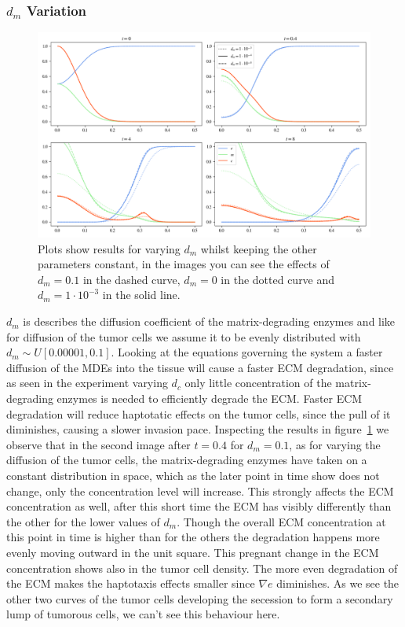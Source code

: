\subsubsection*{$d_m$ Variation}
\begin{figure}[h]
    \centering
    \includegraphics[width=\textwidth]{resources/images/dm_variation.png}
    \caption{Plots show results for varying $d_m$ whilst keeping the other parameters constant, in the images you can see the effects of $d_m=0.1$ in the dashed curve, $d_m=0$ in the dotted curve and $d_m=1\cdot 10^{-3}$ in the solid line.}
    \label{fig:dm_variation}
\end{figure}
$d_m$ is describes the diffusion coefficient of the matrix-degrading enzymes and like for diffusion of the tumor cells we assume it to be evenly distributed with $d_m \sim U[0.00001,0.1]$. Looking at the equations governing the system a faster diffusion of the MDEs into the tissue will cause a faster ECM degradation, since as seen in the experiment varying $d_c$ only little concentration of the matrix-degrading enzymes is needed to efficiently degrade the ECM. Faster ECM degradation will reduce haptotatic effects on the tumor cells, since the pull of it diminishes, causing a slower invasion pace. \newline 
Inspecting the results in figure~\ref{fig:dm_variation} we observe that in the second image after $t=0.4$ for $d_m=0.1$, as for varying the diffusion of the tumor cells, the matrix-degrading enzymes have taken on a constant distribution in space, which as the later point in time show does not change, only the concentration level will increase. This strongly affects the ECM concentration as well, after this short time the ECM has visibly differently than the other for the lower values of $d_m$. Though the overall ECM concentration at this point in time is higher than for the others the degradation happens more evenly moving outward in the unit square. This pregnant change in the ECM concentration shows also in the tumor cell density. The more even degradation of the ECM makes the haptotaxis effects smaller since $\nabla e$ diminishes. As we see the other two curves of the tumor cells developing the secession to form a secondary lump of tumorous cells, we can't see this behaviour here.

